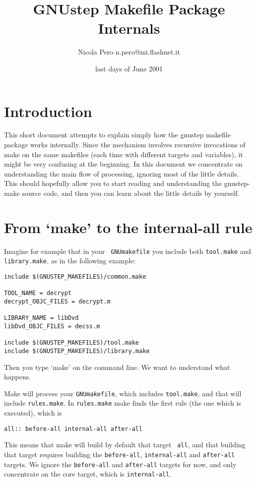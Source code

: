 \documentclass[a4paper]{article}
\begin{document}
\title{GNUstep Makefile Package Internals}
\author{Nicola Pero n.pero@mi.flashnet.it}
\date{last days of June 2001}
\maketitle
\tableofcontents

\section{Introduction}
This short document attempts to explain simply how the gnustep
makefile package works internally.  Since the mechanism involves
recursive invocations of make on the same makefiles (each time with
different targets and variables), it might be very confusing at the
beginning.  In this document we concentrate on understanding the main
flow of processing, ignoring most of the little details.  This should
hopefully allow you to start reading and understanding the
gnustep-make source code, and then you can learn about the little
details by yourself.

\section{From `make' to the internal-all rule}

Imagine for example that in your \texttt{ GNUmakefile} you include both
\texttt{tool.make} and \texttt{library.make}, as in the following example:
\begin{verbatim}
include $(GNUSTEP_MAKEFILES)/common.make

TOOL_NAME = decrypt
decrypt_OBJC_FILES = decrypt.m

LIBRARY_NAME = libDvd
libDvd_OBJC_FILES = decss.m

include $(GNUSTEP_MAKEFILES)/tool.make
include $(GNUSTEP_MAKEFILES)/library.make
\end{verbatim} %
Then you type `make' on the command line.  We want to understand what
happens.

Make will process your \texttt{GNUmakefile}, which includes
\texttt{tool.make}, and that will include \texttt{rules.make}.  In
\texttt{rules.make} make finds the first rule (the one which is
executed), which is
\begin{verbatim}
all:: before-all internal-all after-all
\end{verbatim}
This means that make will build by default that target \texttt{ all},
and that building that target requires building the
\texttt{before-all}, \texttt{internal-all} and \texttt{after-all}
targets.  We ignore the \texttt{before-all} and \texttt{after-all}
targets for now, and only concentrate on the core target, which is
\texttt{internal-all}.
\end{document}
